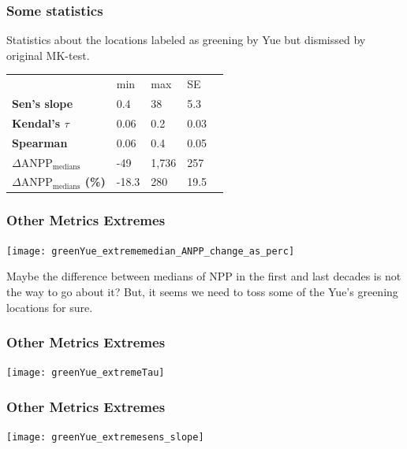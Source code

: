 \documentclass[serif, xcolor={dvipsnames}]{beamer} %
\begin{document}
\begin{frame}
\frametitle{Some statistics}
Statistics about the locations labeled as greening by Yue but dismissed by original MK-test.
\begin{table}[!ht]
\centering
\captionsetup{singlelinecheck=false, format=hang}
\label{tab:Trendcounts}
\begin{tabular}{lllll}
\bottomrule
\rowcolor{shadecolor} 
&  min & max & SE \\ 
\rowcolor{aliceblue} 
\textbf{Sen's slope} & 0.4 & 38 & 5.3 \\
\textbf{Kendal's $\tau$}  & 0.06 & 0.2 &  0.03 \\
\rowcolor{aliceblue} 
\textbf{Spearman}  & 0.06  & 0.4 & 0.05  \\
\textbf{\scriptsize $\Delta \text{ANPP}_{\text{medians}}$} & -49 & 1,736 & 257 \\
\rowcolor{aliceblue}\textbf{\scriptsize $\Delta \text{ANPP}_{\text{medians}}$ (\%)}  & -18.3 & 280 & 19.5 \\
\toprule
\end{tabular}
\end{table}
\end{frame}
\begin{frame}
\frametitle{Other Metrics Extremes}
\begin{center}
\texttt{[image: greenYue\_extrememedian\_ANPP\_change\_as\_perc]}
\end{center}
\vspace{-.2in}
{\scriptsize Maybe the difference between medians of NPP in the first and last decades is not the way to go about it?
But, it seems we need to toss some of the Yue's greening locations for sure.}
\end{frame}
\begin{frame}
\frametitle{Other Metrics Extremes}
\begin{center}
\texttt{[image: greenYue\_extremeTau]}
\end{center}
\end{frame}
\begin{frame}
\frametitle{Other Metrics Extremes}
\begin{center}
\texttt{[image: greenYue\_extremesens\_slope]}
\end{center}
\end{frame}
\end{document}

